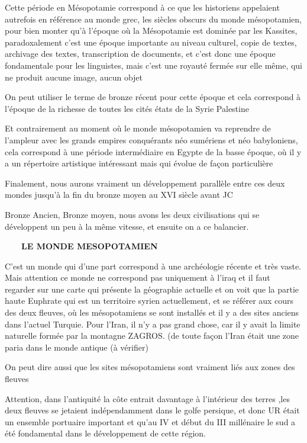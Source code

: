 \documentclass[a4paper,10pt]{article}
\begin{document}
Cette période en Mésopotamie correspond à ce que les historiens
appelaient autrefois en référence au monde grec,  les siècles obscurs
du monde mésopotamien, pour bien monter qu'à
l'époque où la Mésopotamie est dominée par les
Kassites, paradoxalement c'est une époque importante
au niveau culturel, copie de textes, archivage des textes,
transcription de documents, et c'est donc une époque
fondamentale pour les linguistes, mais c'est une
royauté fermée sur elle même, qui ne produit aucune image, aucun objet

On peut utiliser le terme de bronze récent pour cette époque et cela
correspond à l'époque de la richesse de toutes les
cités états de la  Syrie Palestine

Et contrairement au moment où le monde mésopotamien va reprendre de
l'ampleur avec les grands empires conquérants néo
sumériens et néo babyloniens, cela correspond à une période
intermédiaire en Egypte de la basse époque, où il y a un répertoire
artistique intéressant mais qui évolue de façon particulière

Finalement, nous aurons vraiment un développement parallèle entre ces
deux mondes jusqu'à la fin du bronze moyen au XVI
siècle avant JC

Bronze Ancien, Bronze moyen, nous avons les deux civilisations qui se
développent un peu à la même vitesse, et ensuite on a ce balancier.

\ \ \ \ \textbf{LE MONDE MESOPOTAMIEN}

C'est un monde qui d'une part
correspond à une archéologie récente et très vaste. Mais attention ce
monde ne correspond pas uniquement à l'iraq et il faut
regarder sur une carte qui présente la géographie actuelle et on voit
que la partie haute Euphrate qui est un territoire syrien actuellement,
et se référer aux cours des deux fleuves, où les mésopotamiens se sont
installés  et il y a des sites anciens dans l'actuel
Turquie. Pour l'Iran, il n'y  a pas
grand chose, car il y avait la limite naturelle formée par la montagne 
ZAGROS. (de toute façon l'Iran était une zone paria
dans le monde antique (à vérifier)

On peut dire aussi que les sites mésopotamiens sont vraiment liés aux
zones des fleuves

Attention, dans l'antiquité la côte entrait davantage à
l'intérieur des terres ,les deux fleuves se jetaient
indépendamment dans le golfe persique,  et donc UR était un ensemble
portuaire important et qu'au IV et début du III
millénaire le sud a été fondamental dans le développement de cette
région. 
\end{document}
